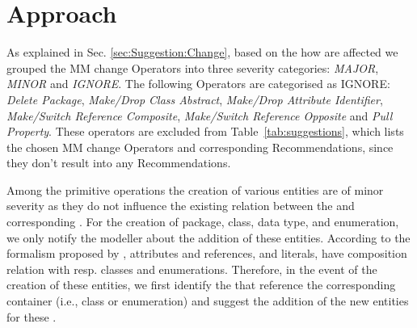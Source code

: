 \section{Approach} 
\label{sec:Approach}


As explained in Sec. \ref{sec:Suggestion:Change}, based on the how \viewtypes are affected we grouped the MM change \textsf{Operator}s into three severity categories: \textit{MAJOR}, \textit{MINOR} and \textit{IGNORE}. The following \textsf{Operator}s are categorised as \textsf{IGNORE}: \textit{Delete Package}, \textit{Make/Drop Class Abstract}, \textit{Make/Drop Attribute Identifier}, \textit{Make/Switch Reference Composite}, \textit{Make/Switch Reference Opposite} and \textit{Pull Property}. These operators are excluded from Table~\ref{tab:suggestions}, which lists the chosen MM change \textsf{Operator}s and corresponding \textsf{Recommendation}s, since they don't result into any \textsf{Recommendation}s.







Among the primitive operations the creation of various entities are of minor severity as they do not influence the existing relation between the \metamodel and corresponding \viewtypes. For the creation of package, class, data type, and enumeration, we only notify the modeller about the addition of these entities. 
According to the \metamodeling formalism proposed by \cite{herrmannsdoerfer_extensive_2011}, attributes and references, and literals, have composition relation with resp. classes and enumerations. Therefore, in the event of the creation of these entities, we first identify the \viewtypes that reference the corresponding container (i.e., class or enumeration) and suggest the addition of the new entities for these \viewtypes.

